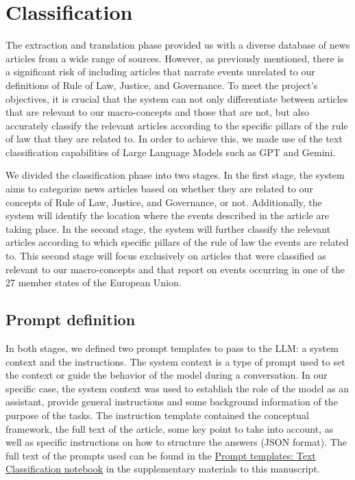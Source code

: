 \documentclass[
]{agujournal2019}
\begin{document}
\section{Classification}\label{sec-class}

The extraction and translation phase provided us with a diverse database
of news articles from a wide range of sources. However, as previously
mentioned, there is a significant risk of including articles that
narrate events unrelated to our definitions of Rule of Law, Justice, and
Governance. To meet the project's objectives, it is crucial that the
system can not only differentiate between articles that are relevant to
our macro-concepts and those that are not, but also accurately classify
the relevant articles according to the specific pillars of the rule of
law that they are related to. In order to achieve this, we made use of
the text classification capabilities of Large Language Models such as
GPT and Gemini.

We divided the classification phase into two stages. In the first stage,
the system aims to categorize news articles based on whether they are
related to our concepts of Rule of Law, Justice, and Governance, or not.
Additionally, the system will identify the location where the events
described in the article are taking place. In the second stage, the
system will further classify the relevant articles according to which
specific pillars of the rule of law the events are related to. This
second stage will focus exclusively on articles that were classified as
relevant to our macro-concepts and that report on events occurring in
one of the 27 member states of the European Union.

\subsection{Prompt definition}\label{prompt-definition}

In both stages, we defined two prompt templates to pass to the LLM: a
system context and the instructions. The system context is a type of
prompt used to set the context or guide the behavior of the model during
a conversation. In our specific case, the system context was used to
establish the role of the model as an assistant, provide general
instructions and some background information of the purpose of the
tasks. The instruction template contained the conceptual framework, the
full text of the article, some key point to take into account, as well
as specific instructions on how to structure the answers (JSON format).
The full text of the prompts used can be found in the
\href{https://ctoruno.github.io/eu-rol-tracker/notebooks/prompts_classification-preview.html}{Prompt
templates: Text Classification notebook} in the supplementary materials
to this manuscript.
\end{document}

